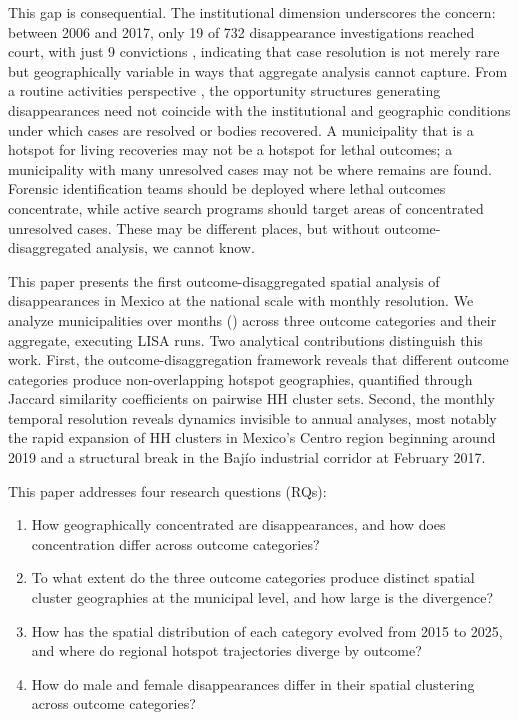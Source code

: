 This gap is consequential.
The institutional dimension underscores the concern: between 2006 and 2017, only 19 of 732 disappearance investigations reached court, with just 9 convictions \citep{garcia_castillo_2024, guevara_bermudez_2018}, indicating that case resolution is not merely rare but geographically variable in ways that aggregate analysis cannot capture.
From a routine activities perspective \citep{cohen_felson_1979}, the opportunity structures generating disappearances need not coincide with the institutional and geographic conditions under which cases are resolved or bodies recovered.
A municipality that is a hotspot for living recoveries may not be a hotspot for lethal outcomes; a municipality with many unresolved cases may not be where remains are found.
Forensic identification teams should be deployed where lethal outcomes concentrate, while active search programs should target areas of concentrated unresolved cases.
These may be different places, but without outcome-disaggregated analysis, we cannot know.

This paper presents the first outcome-disaggregated spatial analysis of disappearances in Mexico at the national scale with monthly resolution.
We analyze \nmunis{} municipalities over \nmonths{} months (\studyperiod{}) across three outcome categories and their aggregate, executing \nLISAruns{} LISA runs.
Two analytical contributions distinguish this work.
First, the outcome-disaggregation framework reveals that different outcome categories produce non-overlapping hotspot geographies, quantified through Jaccard similarity coefficients on pairwise HH cluster sets.
Second, the monthly temporal resolution reveals dynamics invisible to annual analyses, most notably the rapid expansion of HH clusters in Mexico's Centro region beginning around 2019 and a structural break in the Baj\'{i}o industrial corridor at February 2017.

This paper addresses four research questions (RQs):

\begin{enumerate}
  \item[RQ1] How geographically concentrated are
        disappearances, and how does concentration differ across outcome categories?
  \item[RQ2] To what extent do the three outcome categories 
        produce distinct spatial cluster geographies at the municipal level, 
        and how large is the divergence?
  \item [RQ3] How has the spatial distribution of
        each category evolved from 2015 to 2025, and where do regional hotspot 
        trajectories diverge by outcome?
  \item [RQ4] How do male and female disappearances
        differ in their spatial clustering across outcome categories?
\end{enumerate}

